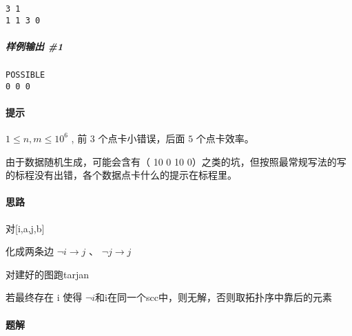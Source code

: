 \documentclass[]{article}
\let\oldparagraph\paragraph
\renewcommand{\paragraph}[1]{\oldparagraph{#1}\mbox{}}
\let\oldsubparagraph\subparagraph
\renewcommand{\subparagraph}[1]{\oldsubparagraph{#1}\mbox{}}
\begin{document}
\begin{verbatim}
3 1
1 1 3 0
\end{verbatim}

\hypertarget{ux6837ux4f8bux8f93ux51fa-1-1}{%
\subparagraph{样例输出 \#1}\label{ux6837ux4f8bux8f93ux51fa-1-1}}

\begin{verbatim}
POSSIBLE
0 0 0
\end{verbatim}

\hypertarget{ux63d0ux793a}{%
\paragraph{提示}\label{ux63d0ux793a}}

\(1\leq n, m\leq 10^6\) , 前 \(3\) 个点卡小错误，后面 \(5\) 个点卡效率。

由于数据随机生成，可能会含有（ 10 0 10
0）之类的坑，但按照最常规写法的写的标程没有出错，各个数据点卡什么的提示在标程里。

\hypertarget{ux601dux8def}{%
\paragraph{思路}\label{ux601dux8def}}

对{[}i,a,j,b{]}

化成两条边 \(\lnot i \to j\) 、 \(\lnot j \to j\)

对建好的图跑tarjan

若最终存在 i 使得
\(\lnot i\)和i在同一个scc中，则无解，否则取拓扑序中靠后的元素

\hypertarget{ux9898ux89e3-1}{%
\paragraph{题解}\label{ux9898ux89e3-1}}
\end{document}
